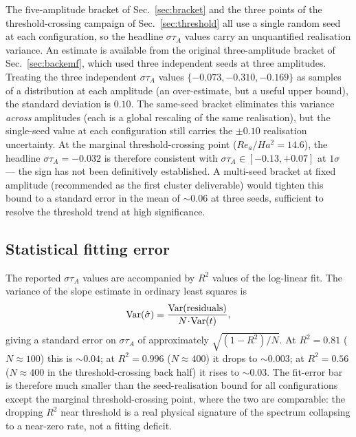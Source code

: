 \documentclass[aps,prl,twocolumn,superscriptaddress]{revtex4-2}
\begin{document}
The five-amplitude bracket of Sec.~\ref{sec:bracket} and the three
points of the threshold-crossing campaign of
Sec.~\ref{sec:threshold} all use a single random seed at each
configuration, so the headline $\sigma\tau_A$ values carry an
unquantified realisation variance.  An estimate is available from
the original three-amplitude bracket of Sec.~\ref{sec:backemf},
which used three independent seeds at three amplitudes.  Treating
the three independent $\sigma\tau_A$ values
$\{-0.073,-0.310,-0.169\}$ as samples of a distribution at each
amplitude (an over-estimate, but a useful upper bound), the standard
deviation is $0.10$.  The same-seed bracket eliminates this variance
\emph{across} amplitudes (each is a global rescaling of the same
realisation), but the single-seed value at each configuration still
carries the $\pm 0.10$ realisation uncertainty.  At the marginal
threshold-crossing point ($Re_a/Ha^{2} = 14.6$), the headline
$\sigma\tau_A = -0.032$ is therefore consistent with
$\sigma\tau_A\!\in\![-0.13,+0.07]$ at $1\sigma$ --- the sign has
not been definitively established.  A multi-seed bracket at fixed
amplitude (recommended as the first cluster deliverable) would
tighten this bound to a standard error in the mean of $\sim\!0.06$
at three seeds, sufficient to resolve the threshold trend at high
significance.

\subsection{Statistical fitting error}

The reported $\sigma\tau_A$ values are accompanied by $R^{2}$ values
of the log-linear fit.  The variance of the slope estimate in
ordinary least squares is
\begin{equation}
\operatorname{Var}(\hat\sigma)
   = \frac{\operatorname{Var}(\rm residuals)}
          {N\!\cdot\!\operatorname{Var}(t)},
\label{eq:olsvar}
\end{equation}
giving a standard error on $\sigma\tau_A$ of approximately
$\sqrt{(1-R^{2})/N}$.  At $R^{2} = 0.81$ ($N\!\approx\!100$) this
is $\sim\!0.04$; at $R^{2} = 0.996$ ($N\!\approx\!400$) it drops to
$\sim\!0.003$; at $R^{2} = 0.56$ ($N\!\approx\!400$ in the
threshold-crossing back half) it rises to $\sim\!0.03$.  The
fit-error bar is therefore much smaller than the seed-realisation
bound for all configurations except the marginal threshold-crossing
point, where the two are comparable: the dropping $R^{2}$ near
threshold is a real physical signature of the spectrum collapsing
to a near-zero rate, not a fitting deficit.
\end{document}
